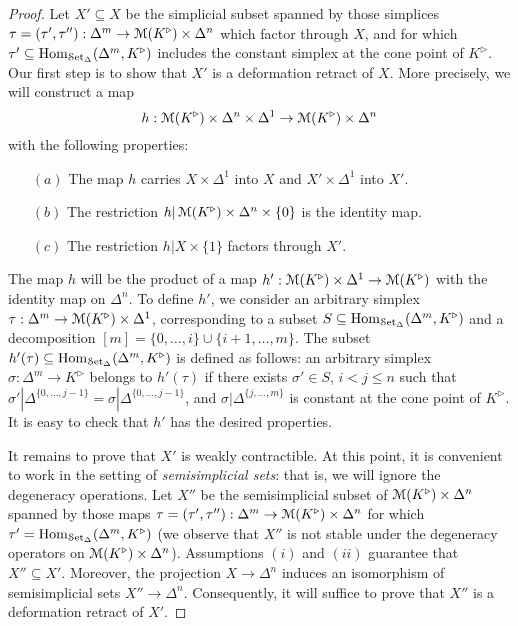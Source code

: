 \begin{proof}
Let $X' \subseteq X$ be the simplicial subset spanned by those simplices
$\tau = (\tau', \tau''): \Delta^m \rightarrow \operatorname{{\mathcal M}}(K^{\triangleright}) \times \Delta^n$ which factor through $X$, and for which $\tau' \subseteq \operatorname{Hom}_{\operatorname{\mathcal{S}et_{\Delta}}}( \Delta^m, K^{\triangleright})$ includes the constant simplex at the cone point of $K^{\triangleright}$. Our first step is to show that $X'$ is a deformation retract of $X$. More precisely, we will construct a map
$$ h: \operatorname{{\mathcal M}}(K^{\triangleright}) \times \Delta^n \times \Delta^1 \rightarrow 
\operatorname{{\mathcal M}}(K^{\triangleright}) \times \Delta^n$$ with the following properties:
\begin{itemize}
\item[$(a)$] The map $h$ carries $X \times \Delta^1$ into $X$ and $X' \times \Delta^1$ into $X'$.
\item[$(b)$] The restriction $h | \operatorname{{\mathcal M}}(K^{\triangleright}) \times \Delta^n \times \{0\}$ is the identity map.
\item[$(c)$] The restriction $h| X \times \{1\}$ factors through $X'$.
\end{itemize}
The map $h$ will be the product of a map $h': \operatorname{{\mathcal M}}(K^{\triangleright}) \times \Delta^1 \rightarrow \operatorname{{\mathcal M}}(K^{\triangleright} )$ with the identity map on $\Delta^n$. To define $h'$, we consider an arbitrary simplex $\tau: \Delta^m \rightarrow \operatorname{{\mathcal M}}(K^{\triangleright}) \times \Delta^1$, corresponding to a subset $S \subseteq \operatorname{Hom}_{\operatorname{\mathcal{S}et_{\Delta}}}( \Delta^m, K^{\triangleright} )$ and a decomposition
$[m] = \{ 0, \ldots, i\} \cup \{i+1, \ldots, m\}$. The subset $h'(\tau) \subseteq \operatorname{Hom}_{\operatorname{\mathcal{S}et_{\Delta}}}( \Delta^m, K^{\triangleright})$ is defined as follows: an arbitrary simplex $\sigma: \Delta^m \rightarrow K^{\triangleright}$ belongs to $h'(\tau)$ if there exists $\sigma' \in S$, $i < j \leq n$ such that
$\sigma' | \Delta^{ \{0, \ldots, j-1 \} } = \sigma| \Delta^{ \{0, \ldots, j-1 \} }$, and $\sigma | \Delta^{ \{j, \ldots, m \} }$ is constant at the cone point of $K^{\triangleright}$. It is easy to check that $h'$ has the desired properties.

It remains to prove that $X'$ is weakly contractible. At this point, it is convenient to work in the setting of {\em semisimplicial sets}: that is, we will ignore the degeneracy operations. Let
$X''$ be the semisimplicial subset of $\operatorname{{\mathcal M}}(K^{\triangleright}) \times \Delta^n$ spanned by those maps $\tau = (\tau', \tau''): \Delta^m \rightarrow \operatorname{{\mathcal M}}(K^{\triangleright}) \times \Delta^n$ for which
$\tau' = \operatorname{Hom}_{\operatorname{\mathcal{S}et_{\Delta}}}( \Delta^m, K^{\triangleright} )$ (we observe that $X''$ is not stable under the degeneracy operators on $\operatorname{{\mathcal M}}(K^{\triangleright}) \times \Delta^n$). Assumptions $(i)$ and $(ii)$ guarantee that $X'' \subseteq X'$. Moreover, the projection $X \rightarrow \Delta^n$ induces an isomorphism of semisimplicial sets $X'' \rightarrow \Delta^n$. Consequently, it will suffice to prove that $X''$ is a deformation retract of $X'$. 


\end{proof}
